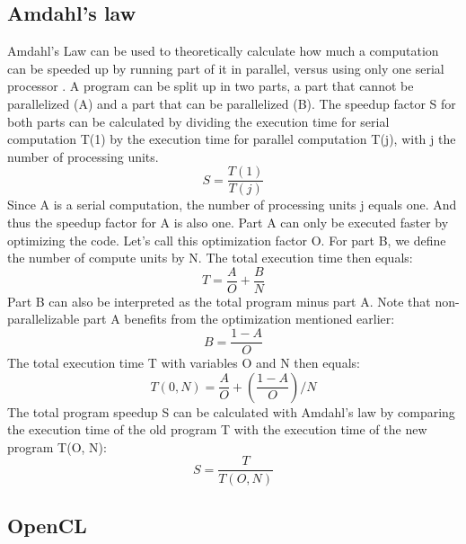\documentclass[a4paper, 11pt]{report}
\begin{document}
	\subsection{Amdahl's law}
Amdahl's Law can be used to theoretically calculate how much a computation can be speeded up by running part of it in parallel, versus using only one serial processor \cite{amdahlslaw}. A program can be split up in two parts, a part that cannot be parallelized (A) and a part that can be parallelized (B). The speedup factor S for both parts can be calculated by dividing the execution time for serial computation T(1) by the execution time for parallel computation T(j), with j the number of processing units.
\begin{equation}
	S = \frac{T(1)}{T(j)}
\end{equation}
Since A is a serial computation, the number of processing units j equals one. And thus the speedup factor for A is also one. Part A can only be executed faster by optimizing the code. Let's call this optimization factor O. For part B, we define the number of compute units by N. The total execution time then equals:
\begin{equation}
	T = \frac{A}{O} + \frac{B}{N}	
\end{equation}
Part B can also be interpreted as the total program minus part A. Note that non-parallelizable part A benefits from the optimization mentioned earlier:
\begin{equation}
	B = \frac{1-A}{O}
\end{equation}
The total execution time T with variables O and N then equals:
\begin{equation}
	T(0, N) = \frac{A}{O} + (\frac{1-A}{O})/N
\end{equation}
The total program speedup S can be calculated with Amdahl's law by comparing the execution time of the old program T with the execution time of the new program T(O, N):
\begin{equation}
	S  = \frac{T}{T(O, N)}
\end{equation}


\subsection{OpenCL}\label{subsec:OpenCL}
\end{document}
